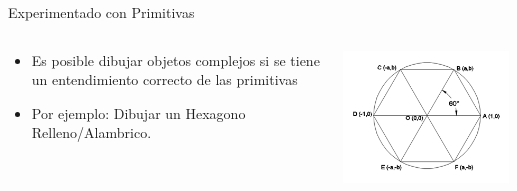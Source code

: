 \documentclass[aspectratio=169,compress]{beamer}
\begin{document}
\begin{frame}{Experimentado con Primitivas}
\begin{columns}
\begin{column}{0.5\textwidth}
\begin{itemize}
\item Es posible dibujar objetos complejos si se tiene un entendimiento correcto de las primitivas 
\item Por ejemplo: Dibujar un Hexagono Relleno/Alambrico. 
\end{itemize}
\end{column}
\begin{column}{0.5\textwidth}
\begin{center}
 \includegraphics[width=0.98\textwidth]{FigsOpenGL/Hexagono}
 \end{center}
\end{column}
\end{columns}

\end{frame}
\end{document}
